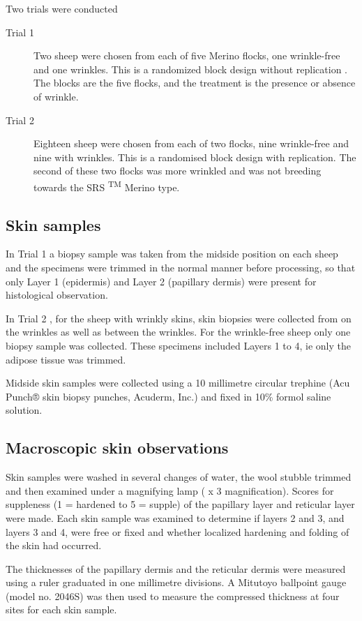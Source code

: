 \documentclass[titlepage]{article}  %
\begin{document}
Two trials were conducted
\begin{description}
\item[Trial 1]  Two sheep were chosen from each of five Merino flocks, one wrinkle-free and one wrinkles. This is a randomized block design without replication .  The blocks are the five flocks, and the treatment is the presence or absence of wrinkle.
\item[Trial 2]  Eighteen sheep were chosen from each of two flocks, nine wrinkle-free and nine with wrinkles. This is a randomised block design with replication. The second of these two flocks was more wrinkled and was not breeding towards the SRS \textsuperscript{TM} Merino type.
\end{description} 
\subsection{Skin samples}
In Trial 1 a biopsy sample was taken from the midside position on each sheep and the specimens were trimmed in the normal manner before processing, so that only Layer 1 (epidermis) and Layer 2 (papillary dermis) were present for histological observation.

In Trial 2 , for the sheep with wrinkly skins, skin biopsies were collected from on the wrinkles as well as between the wrinkles. For the wrinkle-free sheep only one biopsy sample was collected. These specimens included Layers 1 to 4, ie only the adipose tissue was trimmed.

Midside skin samples were collected using a 10 millimetre
circular trephine (Acu Punch® skin biopsy punches, Acuderm, Inc.) and
fixed in 10\% formol saline solution. 

\subsection{Macroscopic skin observations}

Skin samples were washed in several changes of water, the wool
stubble trimmed and then examined under a magnifying lamp ( x 3
magnification).  Scores for  suppleness (1 = hardened to 5 = supple)
of the papillary layer and reticular layer  were made.  Each skin
sample was examined to determine if layers 2 and 3, and layers 3 and 4,
were free or fixed and whether localized hardening and folding of the
skin had occurred.

The thicknesses of the papillary dermis and
the reticular dermis were measured using a ruler graduated in one
millimetre divisions. A Mitutoyo ballpoint gauge
(model no. 2046S) was then used to measure the compressed thickness at
four sites for each skin sample.
\end{document}
